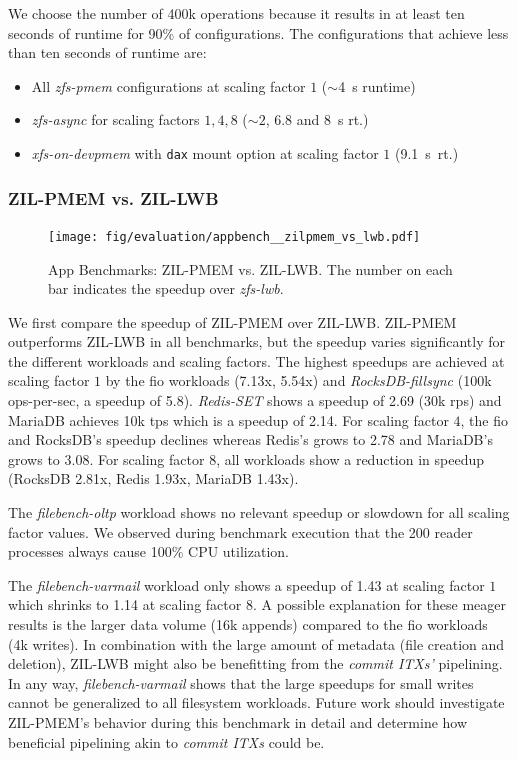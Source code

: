 \documentclass[12pt,a4paper,twoside]{book}
\begin{document}
{\begin{description}[noitemsep,leftmargin=1.5cm,labelindent=1cm]
        We choose the number of 400k operations because it results in at least ten seconds of runtime for 90\% of configurations.
        The configurations that achieve less than ten seconds of runtime are:
        \begin{itemize}[noitemsep]
            \item All \textit{zfs-pmem} configurations at scaling factor $1$ ($\sim$4~s runtime)
            \item \textit{zfs-async} for scaling factors $1, 4, 8$ (${\sim}2$, $6.8$ and 8~s rt.)
            \item \textit{xfs-on-devpmem} with \lstinline{dax} mount option at scaling factor $1$ (9.1~s~rt.)
        \end{itemize}
\end{description}

\subsubsection{ZIL-PMEM vs. ZIL-LWB}\label{sec:eval:zilpmemvslwb}

\begin{figure}[H]
    \centering
    \texttt{[image: fig/evaluation/appbench\_\_zilpmem\_vs\_lwb.pdf]}
    \caption{App Benchmarks: ZIL-PMEM vs. ZIL-LWB. The number on each bar indicates the speedup over \textit{zfs-lwb}.}
    \label{fig:eval:appbenchmarks:zilpmem_vs_zilllwb}
\end{figure}

We first compare the speedup of ZIL-PMEM over ZIL-LWB.
ZIL-PMEM outperforms ZIL-LWB in all benchmarks, but the speedup varies significantly for the different workloads and scaling factors.
The highest speedups are achieved at scaling factor $1$ by the fio workloads (7.13x, 5.54x) and \textit{RocksDB-fillsync} (100k ops-per-sec, a speedup of 5.8).
\textit{Redis-SET} shows a speedup of 2.69 (30k rps) and MariaDB achieves 10k tps which is a speedup of 2.14.
For scaling factor $4$, the fio and RocksDB's speedup declines whereas Redis's grows to 2.78 and MariaDB's grows to 3.08.
For scaling factor $8$, all workloads show a reduction in speedup (RocksDB 2.81x, Redis 1.93x, MariaDB 1.43x).

The \textit{filebench-oltp} workload shows no relevant speedup or slowdown for all scaling factor values.
We observed during benchmark execution that the 200 reader processes always cause 100\% CPU utilization.

The \textit{filebench-varmail} workload only shows a speedup of 1.43 at scaling factor $1$ which shrinks to 1.14 at scaling factor $8$.
A possible explanation for these meager results is the larger data volume (16k appends) compared to the fio workloads (4k writes).
In combination with the large amount of metadata (file creation and deletion), ZIL-LWB might also be benefitting from the \textit{commit ITXs'} pipelining.
In any way, \textit{filebench-varmail} shows that the large speedups for small writes cannot be generalized to all filesystem workloads.
Future work should investigate ZIL-PMEM's behavior during this benchmark in detail and determine how beneficial pipelining akin to \textit{commit ITXs} could be.

}
\end{document}
